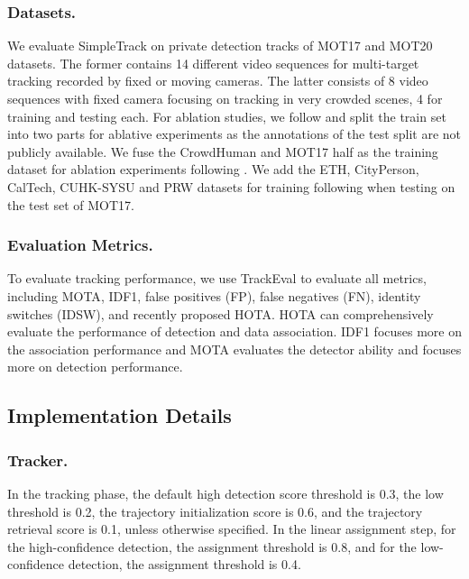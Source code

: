 \documentclass[runningheads]{llncs}
\begin{document}
\subsubsection{Datasets.}
We evaluate SimpleTrack on private detection tracks of MOT17\cite{milan2016mot16} and MOT20\cite{dendorfer2020mot20} datasets. The former contains 14 different video sequences for multi-target tracking recorded by fixed or moving cameras. The latter consists of 8 video sequences with fixed camera focusing on tracking in very crowded scenes, 4 for training and testing each. For ablation studies, we follow \cite{saleh2021probabilistic,shan2020tracklets,wang2021multiple,wu2021track,zhou2020tracking} and split the train set into two parts for ablative experiments as the annotations of the test split are not publicly available. We fuse the CrowdHuman\cite{shao2018crowdhuman} and MOT17 half as the training dataset for ablation experiments following \cite{sun2020transtrack,wu2021track,zeng2021motr,zhang2021bytetrack,zhou2020tracking}. We add the ETH\cite{ess2008mobile}, CityPerson\cite{zhang2017citypersons}, CalTech\cite{dollar2009pedestrian}, CUHK-SYSU\cite{xiao2017joint} and PRW\cite{zheng2017person} datasets for training following \cite{liang2020rethinking,wang2020towards,zhang2021fairmot} when testing on the test set of MOT17.
\subsubsection{Evaluation Metrics.}
To evaluate tracking performance, we use TrackEval\cite{luiten2020trackeval} to evaluate all metrics, including MOTA\cite{bernardin2006multiple}, IDF1\cite{ristani2016performance}, false positives (FP), false negatives (FN), identity switches (IDSW), and recently proposed HOTA\cite{luiten2021hota}. HOTA can comprehensively evaluate the performance of detection and data association. IDF1 focuses more on the association performance and MOTA evaluates the detector ability and focuses more on detection performance. 
\subsection{Implementation Details}
\subsubsection{Tracker.}
In the tracking phase, the default high detection score threshold  is 0.3, the low threshold  is 0.2, the trajectory initialization score  is 0.6, and the trajectory retrieval score  is 0.1, unless otherwise specified. In the linear assignment step, for the high-confidence detection, the assignment threshold is 0.8, and for the low-confidence detection, the assignment threshold is 0.4.
\end{document}
